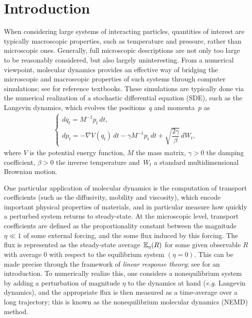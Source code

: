 \section{Introduction}
\label{sec:introduction}
%
When considering large systems of interacting particles, quantities of interest are typically macroscopic properties, such as temperature and pressure, rather than microscopic ones. Generally, full microscopic descriptions are not only too large to be reasonably considered, but also largely uninteresting. From a numerical viewpoint, molecular dynamics provides an effective way of bridging the microscopic and macroscopic properties of such systems through computer simulations; see \cite{tuckerman, leimkuhler_matthews_book, allen_tildesley} for reference textbooks. These simulations are typically done via the numerical realization of a stochastic differential equation (SDE), such as the Langevin dynamics, which evolves the positions~$q$ and momenta~$p$ as
%
\begin{equation}
\begin{aligned}
\begin{cases}
    dq_t = M^{-1} p_t \, dt, \\
    dp_t = -\nabla V(q_t) \, dt - \gamma M^{-1} p_t \, dt + \sqrt{\dfrac{2\gamma}{\beta}} \, dW_t,
    \label{eq:lang_dynamics}
\end{cases}
\end{aligned}
\end{equation}
%
where $V$ is the potential energy function, $M$ the mass matrix, $\gamma>0$ the damping coefficient, $\beta>0$ the inverse temperature and~$W_t$ a standard multidimensional Brownian motion.

One particular application of molecular dynamics is the computation of transport coefficients (such as the diffusivity, mobility and viscosity), which encode important physical properties of materials, and in particular measure how quickly a perturbed system returns to steady-state. At the microscopic level, transport coefficients are defined as the proportionality constant between the magnitude $\eta\ll 1$ of some external forcing, and the some flux induced by this forcing. The flux is represented as the steady-state average~$\mathbb{E}_\eta(R)$ for some given observable $R$ with average 0 with respect to the equilibrium system $(\eta=0)$. This can be made precise through the framework of \emph{linear response theory}; see \cite[Chapter 8]{chandler1987} for an introduction. To numerically realize this, one considers a nonequilibrium system by adding a perturbation of magnitude $\eta$ to the dynamics at hand (\emph{e.g.} Langevin dynamics), and the appropriate flux is then measured as a time-average over a long trajectory; this is known as the nonequilibrium molecular dynamics (NEMD) method.

